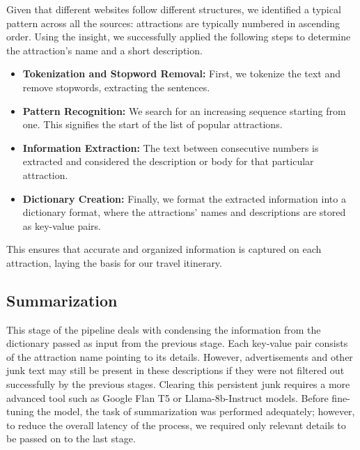 \documentclass[manuscript,review,anonymous]{acmart}
\begin{document}
        Given that different websites follow different structures, we identified a typical pattern across all the sources: attractions are typically numbered in ascending order. Using the insight, we successfully applied the following steps to determine the attraction's name and a short description.
        
        \begin{itemize}
            \item \textbf{Tokenization and Stopword Removal:} First, we tokenize the text and remove stopwords, extracting the sentences.
            
            \item \textbf{Pattern Recognition:} We search for an increasing sequence starting from one. This signifies the start of the list of popular attractions.
            
            \item \textbf{Information Extraction:} The text between consecutive numbers is extracted and considered the description or body for that particular attraction.
            
            \item \textbf{Dictionary Creation:} Finally, we format the extracted information into a dictionary format, where the attractions' names and descriptions are stored as key-value pairs.
        \end{itemize}
        
        This ensures that accurate and organized information is captured on each attraction, laying the basis for our travel itinerary.
    
    \vspace{-7pt}
    
    \subsection{Summarization}
        This stage of the pipeline deals with condensing the information from the dictionary passed as input from the previous stage. Each key-value pair consists of the attraction name pointing to its details. However, advertisements and other junk text may still be present in these descriptions if they were not filtered out successfully by the previous stages. Clearing this persistent junk requires a more advanced tool such as Google Flan T5 or Llama-8b-Instruct models. Before fine-tuning the model, the task of summarization was performed adequately; however, to reduce the overall latency of the process, we required only relevant details to be passed on to the last stage.
        
\end{document}
